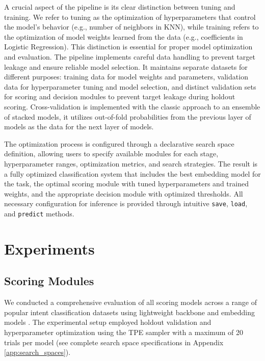 A crucial aspect of the pipeline is its clear distinction between tuning and training. We refer to tuning as the optimization of hyperparameters that control the model's behavior (e.g., number of neighbors in KNN), while training refers to the optimization of model weights learned from the data (e.g., coefficients in Logistic Regression). This distinction is essential for proper model optimization and evaluation. The pipeline implements careful data handling to prevent target leakage and ensure reliable model selection. It maintains separate datasets for different purposes: training data for model weights and parameters, validation data for hyperparameter tuning and model selection, and distinct validation sets for scoring and decision modules to prevent target leakage during holdout scoring. Cross-validation is implemented with the classic approach to an ensemble of stacked models, it utilizes out-of-fold probabilities from the previous layer of models as the data for the next layer of models.

The optimization process is configured through a declarative search space definition, allowing users to specify available modules for each stage, hyperparameter ranges, optimization metrics, and search strategies. The result is a fully optimized classification system that includes the best embedding model for the task, the optimal scoring module with tuned hyperparameters and trained weights, and the appropriate decision module with optimized thresholds. All necessary configuration for inference is provided through intuitive \texttt{save}, \texttt{load}, and \texttt{predict} methods.

\section{Experiments}

\subsection{Scoring Modules}\label{sec:scoring_experiments}

We conducted a comprehensive evaluation of all scoring models across a range of popular intent classification datasets \cite{banking77,minds14,hwu64,snips,massive} using lightweight backbone \cite{he2021debertav3} and embedding models \cite{reimers-2019-sentence-bert}. The experimental setup employed holdout validation and hyperparameter optimization using the TPE sampler \cite{watanabe2023treestructuredparzenestimatorunderstanding} with a maximum of 20 trials per model (see complete search space specifications in Appendix \ref{app:search_spaces}).

